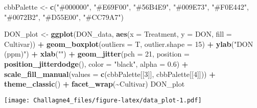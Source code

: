 \documentclass[
]{article}
\newenvironment{Shaded}{\begin{snugshade}}{\end{snugshade}}
\newcommand{\AttributeTok}[1]{\textcolor[rgb]{0.13,0.29,0.53}{#1}}
\newcommand{\DecValTok}[1]{\textcolor[rgb]{0.00,0.00,0.81}{#1}}
\newcommand{\FloatTok}[1]{\textcolor[rgb]{0.00,0.00,0.81}{#1}}
\newcommand{\FunctionTok}[1]{\textcolor[rgb]{0.13,0.29,0.53}{\textbf{#1}}}
\newcommand{\NormalTok}[1]{#1}
\newcommand{\OtherTok}[1]{\textcolor[rgb]{0.56,0.35,0.01}{#1}}
\newcommand{\SpecialCharTok}[1]{\textcolor[rgb]{0.81,0.36,0.00}{\textbf{#1}}}
\newcommand{\StringTok}[1]{\textcolor[rgb]{0.31,0.60,0.02}{#1}}
\begin{document}
\begin{Shaded}
\begin{Highlighting}[]
\NormalTok{cbbPalette }\OtherTok{\textless{}{-}} \FunctionTok{c}\NormalTok{(}\StringTok{"\#000000"}\NormalTok{, }\StringTok{"\#E69F00"}\NormalTok{, }\StringTok{"\#56B4E9"}\NormalTok{, }\StringTok{"\#009E73"}\NormalTok{, }\StringTok{"\#F0E442"}\NormalTok{, }\StringTok{"\#0072B2"}\NormalTok{, }\StringTok{"\#D55E00"}\NormalTok{, }\StringTok{"\#CC79A7"}\NormalTok{)}


\NormalTok{DON\_plot }\OtherTok{\textless{}{-}} \FunctionTok{ggplot}\NormalTok{(DON\_data, }\FunctionTok{aes}\NormalTok{(}\AttributeTok{x =}\NormalTok{ Treatment, }\AttributeTok{y =}\NormalTok{ DON, }\AttributeTok{fill =}\NormalTok{ Cultivar)) }\SpecialCharTok{+}
  \FunctionTok{geom\_boxplot}\NormalTok{(}\AttributeTok{outliers =}\NormalTok{ T, }\AttributeTok{outlier.shape =} \DecValTok{15}\NormalTok{) }\SpecialCharTok{+}
  \FunctionTok{ylab}\NormalTok{(}\StringTok{"DON (ppm)"}\NormalTok{) }\SpecialCharTok{+}
  \FunctionTok{xlab}\NormalTok{(}\StringTok{""}\NormalTok{) }\SpecialCharTok{+}
  \FunctionTok{geom\_jitter}\NormalTok{(}\AttributeTok{pch =} \DecValTok{21}\NormalTok{, }\AttributeTok{position =} \FunctionTok{position\_jitterdodge}\NormalTok{(), }\AttributeTok{color =} \StringTok{"black"}\NormalTok{, }\AttributeTok{alpha =} \FloatTok{0.6}\NormalTok{) }\SpecialCharTok{+} 
  \FunctionTok{scale\_fill\_manual}\NormalTok{(}\AttributeTok{values =} \FunctionTok{c}\NormalTok{(cbbPalette[[}\DecValTok{3}\NormalTok{]], cbbPalette[[}\DecValTok{4}\NormalTok{]])) }\SpecialCharTok{+}
  \FunctionTok{theme\_classic}\NormalTok{() }\SpecialCharTok{+}
  \FunctionTok{facet\_wrap}\NormalTok{(}\SpecialCharTok{\textasciitilde{}}\NormalTok{Cultivar)}
\NormalTok{DON\_plot}
\end{Highlighting}
\end{Shaded}

\texttt{[image: Challagne4\_files/figure-latex/data\_plot-1.pdf]}
\end{document}
